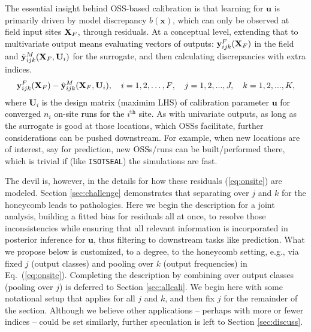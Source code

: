\documentclass[12pt]{article}
\newcommand{\blu}[1]{\textcolor{black}{#1}} %
\newcommand{\blunew}[1]{\textcolor{black}{#1}} %
\begin{document}
The essential insight behind OSS-based calibration is that learning for
$\mathbf{u}$ is primarily driven by model discrepancy $b(\mathbf{x})$, which
can only be observed at field input sites $\mathbf{X}_{\blunew{F}}$, through
residuals.  At a conceptual level, extending that to multivariate output
\blunew{means evaluating vectors of outputs}:
$\mathbf{y}_{ijk}^F({\mathbf{X}_{\blunew{F}}})$ in the field and
$\hat{\mathbf{y}}_{ijk}^{M}({\mathbf{X}_{\blunew{F}},  \mathbf{U}_i})$ for the
surrogate, and then calculating discrepancies with extra indices.
\begin{align}
\mathbf{y}_{ijk}^F({\mathbf{X}_{\blunew{F}}})-\hat{\mathbf{y}}_{ijk}^{M}({\mathbf{X}_{\blunew{F}}, \mathbf{U}_i}), \quad i = 1, 2, \dots, \blunew{F}, \quad j=1,2, ..., J, \quad k=1,2, ..., K,
\label{eq:onsite}
\end{align}
\blu{where $ \mathbf{U}_i$ is the design matrix (maximim LHS) 
of  calibration parameter $\mathbf{u}$
for converged $n_i$ on-site runs for the $i^\mathrm{th}$ site.}
As with univariate outputs, as long as the surrogate is
good at those locations, which OSSs facilitate, further considerations can be
pushed downstream.  For example, when new locations are of interest, say for
prediction, new OSSs/runs can be built/performed there, which is trivial if
(like {\tt ISOTSEAL}) the simulations are fast.

The devil is, however, in the details for how these residuals
(\ref{eq:onsite}) are modeled.  Section \ref{sec:challenge} demonstrates that
separating over $j$ and $k$ for the honeycomb leads to pathologies.  Here we
begin the description for a joint analysis, building a fitted bias for residuals
all at once, to resolve those inconsistencies while ensuring that all relevant
information is incorporated in posterior inference for $\mathbf{u}$, thus
filtering to downstream tasks like prediction.  What we propose below is
customized, to a degree, to the honeycomb setting, e.g., via fixed $j$ (output
classes) and pooling over $k$ (output frequencies) in Eq.~(\ref{eq:onsite}).
Completing the description by combining over output classes (pooling over $j$)
is deferred to Section \ref{sec:allcali}.  %
We begin here with some notational setup that applies for
all $j$ and $k$, and then fix $j$ for the remainder of the section. Although
we believe other applications -- perhaps with more or fewer indices -- could
be set similarly, further speculation is left to Section \ref{sec:discuss}.
\end{document}

